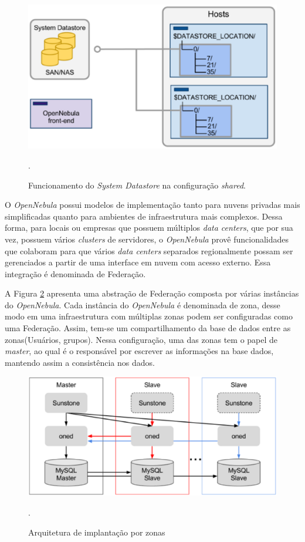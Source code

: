 \begin{figure}[!htb]
\centering
\includegraphics [keepaspectratio=true,scale=0.4]{figuras/shared_datastore.eps}
\caption{Funcionamento do \textit{System Datastore} na configuração \textit{shared}. }
\cite{opennebula}.
\label{shared_datastore}
\end{figure}

O \textit{OpenNebula} possui modelos de implementação tanto para nuvens privadas mais simplificadas quanto para ambientes de infraestrutura mais complexos. Dessa forma, para locais ou empresas que possuem múltiplos \textit{data centers}, que por sua vez, possuem vários \textit{clusters} de servidores, o \textit{OpenNebula} provê funcionalidades que colaboram para que vários \textit{data centers} separados regionalmente possam ser gerenciados a partir de uma interface em nuvem com acesso externo. Essa integração é denominada de Federação. 

A Figura \ref{opennebulafederation} apresenta uma abstração de Federação composta por várias instâncias do \textit{OpenNebula}. Cada instância do \textit{OpenNebula} é denominada de zona, desse modo em uma infraestrutura com múltiplas zonas podem ser configuradas como uma Federação. Assim, tem-se um compartilhamento da base de dados entre as zonas(Usuários, grupos). Nessa configuração, uma das zonas tem o papel de \textit{master}, ao qual é o responsável por escrever as informações na base dados, mantendo assim a consistência nos dados\cite{opennebula}.

\begin{figure}[!htb]
\centering
\includegraphics [keepaspectratio=true,scale=0.350]{figuras/opennebula_zone.eps}
\caption{Arquitetura de implantação por zonas}
\cite{opennebula}.
\label{opennebulafederation}
\end{figure}

